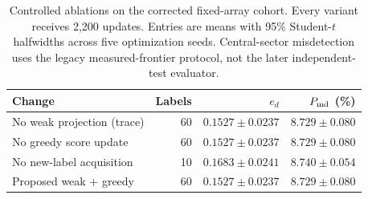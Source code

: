 \begin{table}[t]\centering\small
\caption{Controlled ablations on the corrected fixed-array cohort. Every variant receives 2,200 updates. Entries are means with 95\% Student-$t$ halfwidths across five optimization seeds. Central-sector misdetection uses the legacy measured-frontier protocol, not the later independent-test evaluator.}\label{tab:final-ablation}
\setlength{\tabcolsep}{3pt}
\begin{tabular}{lrrr}\toprule Change & Labels & $e_d$ & $P_{\rm md}$ (\%)\\\midrule
No weak projection (trace) & 60 & $0.1527\pm0.0237$ & $8.729\pm0.080$ \\
No greedy score update & 60 & $0.1527\pm0.0237$ & $8.729\pm0.080$ \\
No new-label acquisition & 10 & $0.1683\pm0.0241$ & $8.740\pm0.054$ \\
Proposed weak + greedy & 60 & $0.1527\pm0.0237$ & $8.729\pm0.080$ \\
\bottomrule\end{tabular}
\end{table}
